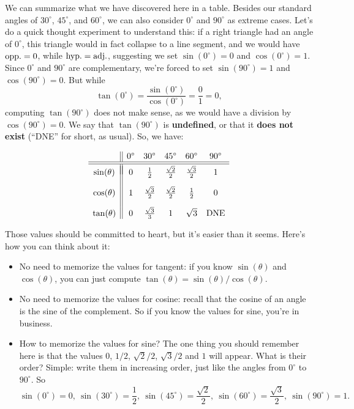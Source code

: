 \documentclass{ximera}
\begin{document}
We can summarize what we have discovered here in a table. Besides our standard angles of $30^\circ$, $45^\circ$, and $60^\circ$, we can also consider $0^\circ$ and $90^\circ$ as extreme cases. Let's do a quick thought experiment to understand this: if a right triangle had an angle of $0^\circ$, this triangle would in fact collapse to a line segment, and we would have ${\rm opp.} = 0$, while ${\rm hyp}. = {\rm adj}.$, suggesting we set $\sin(0^\circ) = 0$ and $\cos(0^\circ) = 1$. Since $0^\circ$ and $90^\circ$ are complementary, we're forced to set $\sin(90^\circ) = 1$ and $\cos(90^\circ) = 0$. But while $$\tan(0^\circ) = \frac{\sin(0^\circ)}{\cos(0^\circ)} = \frac{0}{1} = 0,$$computing $\tan(90^\circ)$ does not make sense, as we would have a division by $\cos(90^\circ) = 0$. We say that $\tan(90^ \circ)$ is {\bf undefined}, or that it {\bf does not exist} (``DNE'' for short, as usual). So, we have:

$$
\begin{array}{c||ccccc}
 & 0^\circ & 30^\circ & 45^\circ & 60^\circ & 90^\circ \\
\hline\hline \\[-1em]  
\sin(\theta) & 0 & \frac{1}{2} & \frac{\sqrt{2}}{2} & \frac{\sqrt{3}}{2} & 1 \\[1em]
 \cos(\theta) & 1 & \frac{\sqrt{3}}{2} & \frac{\sqrt{2}}{2} & \frac{1}{2} & 0 \\[1em]
\tan(\theta)& 0 & \frac{\sqrt{3}}{3} & 1 & \sqrt{3} & {\rm DNE}
\end{array}
$$

Those values should be committed to heart, but it's easier than it seems. Here's how you can think about it:

\begin{itemize}
\item No need to memorize the values for tangent: if you know $\sin(\theta)$ and $\cos(\theta)$, you can just compute $\tan(\theta) = \sin(\theta)/\cos(\theta)$.
\item No need to memorize the values for cosine: recall that the cosine of an angle is the sine of the complement. So if you know the values for sine, you're in business.
\item How to memorize the values for sine? The one thing you should remember here is that the values $0$, $1/2$, $\sqrt{2}/2$, $\sqrt{3}/2$ and $1$ will appear. What is their order? Simple: write them in increasing order, just like the angles from $0^\circ$ to $90^\circ$. So $$\sin(0^\circ) = 0, ~ \sin(30^\circ) = \frac{1}{2}, ~ \sin(45^\circ) = \frac{\sqrt{2}}{2}, ~ \sin(60^\circ) = \frac{\sqrt{3}}{2}, ~ \sin(90^\circ)=1.$$
\end{itemize}
\end{document}
